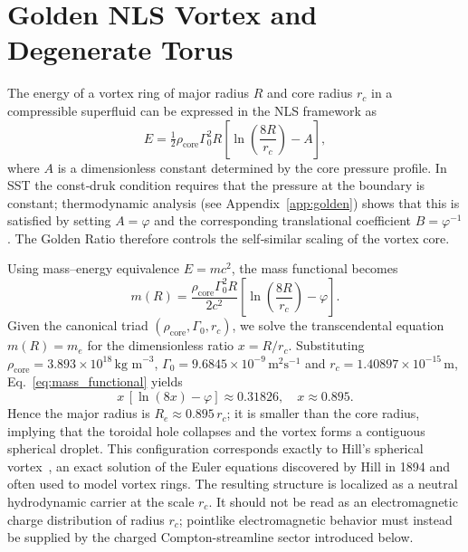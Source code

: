 \documentclass[11pt]{article}
\newcommand{\rc}{r_c}                                    %
\newcommand{\rhocore}{\rho_{\text{core}}}
\newcommand{\GammaSST}{\Gamma_0}                         %
\newcommand{\phiG}{\varphi}
\begin{document}
\section{Golden NLS Vortex and Degenerate Torus}
\label{sec:NLS}

The energy of a vortex ring of major radius $R$ and core radius $\rc$ in a compressible superfluid can be expressed in the NLS framework as
\begin{equation}
    E = \tfrac{1}{2} \rhocore \GammaSST^2 R \left[ \ln \left( \frac{8R}{\rc} \right) - A \right],
    \label{eq:NLS_energy}
\end{equation}
where $A$ is a dimensionless constant determined by the core pressure profile.  In SST the const‑druk condition requires that the pressure at the boundary is constant; thermodynamic analysis (see Appendix~\ref{app:golden}) shows that this is satisfied by setting $A=\phiG$ and the corresponding translational coefficient $B=\phiG^{-1}$.  The Golden Ratio therefore controls the self‑similar scaling of the vortex core.

Using mass–energy equivalence $E = m c^2$, the mass functional becomes
\begin{equation}
    m(R) = \frac{\rhocore \GammaSST^2 R}{2 c^2} \left[ \ln \left( \frac{8R}{\rc} \right) - \phiG \right].
    \label{eq:mass_functional}
\end{equation}
Given the canonical triad $(\rhocore,\GammaSST,\rc)$, we solve the transcendental equation $m(R)=m_e$ for the dimensionless ratio $x=R/\rc$.  Substituting $\rhocore = 3.893\times 10^{18}\,\text{kg m}^{-3}$, $\GammaSST = 9.6845\times 10^{-9}\,\text{m}^2\text{s}^{-1}$ and $\rc = 1.40897\times 10^{-15}\,\text{m}$, Eq.~\eqref{eq:mass_functional} yields
\begin{equation}
    x\,[\ln(8x) - \phiG] \approx 0.31826,\quad x \approx 0.895.
\end{equation}
Hence the major radius is $R_e \approx 0.895\,\rc$; it is smaller than the core radius, implying that the toroidal hole collapses and the vortex forms a contiguous spherical droplet.  This configuration corresponds exactly to Hill's spherical vortex~\cite{Hill1894}, an exact solution of the Euler equations discovered by Hill in 1894 and often used to model vortex rings.  The resulting structure is localized as a neutral hydrodynamic carrier at the scale $\rc$.  It should not be read as an electromagnetic charge distribution of radius $\rc$; pointlike electromagnetic behavior must instead be supplied by the charged Compton-streamline sector introduced below.
\end{document}
